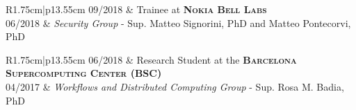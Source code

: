 \documentclass[a4paper,10pt]{article} %
\newcommand\rightColumnWidth{13.55cm}
\newcommand\leftColumnWidth{1.75cm}
\begin{document}
\begin{tabular}{R{\leftColumnWidth}|p{\rightColumnWidth}}
    \textsc{09/2018} & Trainee at \textbf{\textsc{Nokia Bell Labs}} \\
    \textsc{06/2018} & \small{\emph{Security Group} - Sup. Matteo Signorini, PhD and Matteo Pontecorvi, PhD}\\
\end{tabular}

\begin{tabular}{R{\leftColumnWidth}|p{\rightColumnWidth}}
    \textsc{06/2018} & Research Student at the \textbf{\textsc{Barcelona Supercomputing Center} (BSC)} \\
    \textsc{04/2017} & \small{\emph{Workflows and Distributed Computing Group} - Sup. Rosa M. Badia, PhD} \\
\end{tabular}
\end{document}
